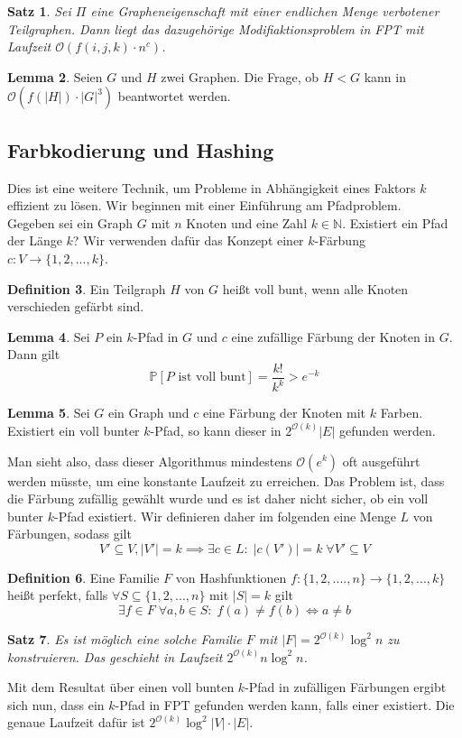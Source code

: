 \documentclass[a4paper, 12pt]{article}
\theoremstyle{plain}
\newtheorem{theorem}{Satz}[section] %
\theoremstyle{definition}
\newtheorem{definition}[theorem]{Definition} %
\theoremstyle{lemma}
\newtheorem{lemma}[theorem]{Lemma}
\theoremstyle{remark}
\theoremstyle{corollary}
\theoremstyle{example}
\begin{document}
	\begin{theorem}
		Sei $\Pi$ eine Grapheneigenschaft mit einer endlichen Menge verbotener Teilgraphen. Dann liegt das dazugehörige Modifiaktionsproblem in FPT mit Laufzeit $\mathcal{O}(f(i,j,k)\cdot n^c)$.
	\end{theorem}
	\begin{lemma}
		Seien $G$ und $H$ zwei Graphen. Die Frage, ob $H<G$ kann in $\mathcal{O}(f\left(\left|H\right|\right)\cdot \left|G\right|^3)$ beantwortet werden.
	\end{lemma}
	\subsection{Farbkodierung und Hashing}
	Dies ist eine weitere Technik, um Probleme in Abhängigkeit eines Faktors $k$ effizient zu lösen. Wir beginnen mit einer Einführung am Pfadproblem.\\
	Gegeben sei ein Graph $G$ mit $n$ Knoten und eine Zahl $k \in \mathbb{N}$. Existiert ein Pfad der Länge $k$? Wir verwenden dafür das Konzept einer $k$-Färbung $c: V \to \{1,2,...,k\}$.
	\begin{definition}
		Ein Teilgraph $H$ von $G$ heißt voll bunt, wenn alle Knoten verschieden gefärbt sind.
	\end{definition}
	\begin{lemma}
		Sei $P$ ein $k$-Pfad in $G$ und $c$ eine zufällige Färbung der Knoten in $G$. Dann gilt \[\mathbb{P}[P \text{ ist voll bunt}] = \frac{k!}{k^k} > e^{-k}\]
	\end{lemma}
	\begin{lemma}
		Sei $G$ ein Graph und $c$ eine Färbung der Knoten mit $k$ Farben. Existiert ein voll bunter $k$-Pfad, so kann dieser in $2^{\mathcal{O}(k)}\left|E\right|$ gefunden werden.
	\end{lemma}
	Man sieht also, dass dieser Algorithmus mindestens $\mathcal{O}(e^k)$ oft ausgeführt werden müsste, um eine konstante Laufzeit zu erreichen. Das Problem ist, dass die Färbung zufällig gewählt wurde und es ist daher nicht sicher, ob ein voll bunter $k$-Pfad existiert. Wir definieren daher im folgenden eine Menge $L$ von Färbungen, sodass gilt \[V' \subseteq V, \left|V'\right| = k \implies \exists c \in L: \; \left|c(V')\right| = k \; \forall V' \subseteq V\]
	\begin{definition}
		Eine Familie $F$ von Hashfunktionen $f: \{1,2,....,n\} \to \{1,2,...,k\}$ heißt perfekt, falls $\forall S \subseteq \{1,2,...,n\}$ mit $\left|S\right| = k$ gilt \[\exists f \in F\; \forall a,b \in S: \; f(a) \neq f(b) \Leftrightarrow a \neq b\]
	\end{definition}
	\begin{theorem}
		Es ist möglich eine solche Familie $F$ mit $\left|F\right| = 2^{\mathcal{O}(k)} \log^2 n$ zu konstruieren. Das geschieht in Laufzeit $2^{\mathcal{O}(k)} n \log^2 n$.
	\end{theorem}
	Mit dem Resultat über einen voll bunten $k$-Pfad in zufälligen Färbungen ergibt sich nun, dass ein $k$-Pfad in FPT gefunden werden kann, falls einer existiert. Die genaue Laufzeit dafür ist $2^{\mathcal{O}(k)} \log^2 \left|V\right| \cdot \left|E\right|$.\\
	
\end{document}
